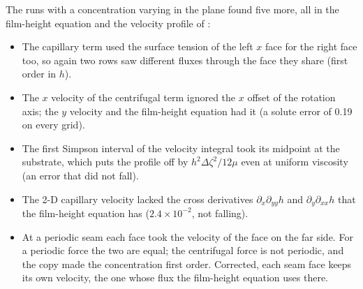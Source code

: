 The  runs with a concentration varying in the plane found five
more, all in the film-height equation and the velocity profile of
:
\begin{itemize}
  \item The capillary term used the surface tension of the left $x$ face for
    the right face too, so again two rows saw different fluxes through the
    face they share (first order in $h$).
  \item The $x$ velocity of the centrifugal term ignored the $x$ offset of
    the rotation axis; the $y$ velocity and the film-height equation had it
    (a solute error of 0.19 on every grid).
  \item The first Simpson interval of the velocity integral took its
    midpoint at the substrate, which puts the profile off by
    $h^2\Delta\zeta^2/12\mu$ even at uniform viscosity (an error that did not
    fall).
  \item The 2-D capillary velocity lacked the cross derivatives
    $\partial_x\partial_{yy}h$ and $\partial_y\partial_{xx}h$ that the
    film-height equation has ($2.4\times10^{-2}$, not falling).
  \item At a periodic seam each face took the velocity of the face on the
    far side. For a periodic force the two are equal; the centrifugal force
    is not periodic, and the copy made the concentration first order.
    Corrected, each seam face keeps its own velocity, the one whose flux the film-height
    equation uses there.
\end{itemize}

